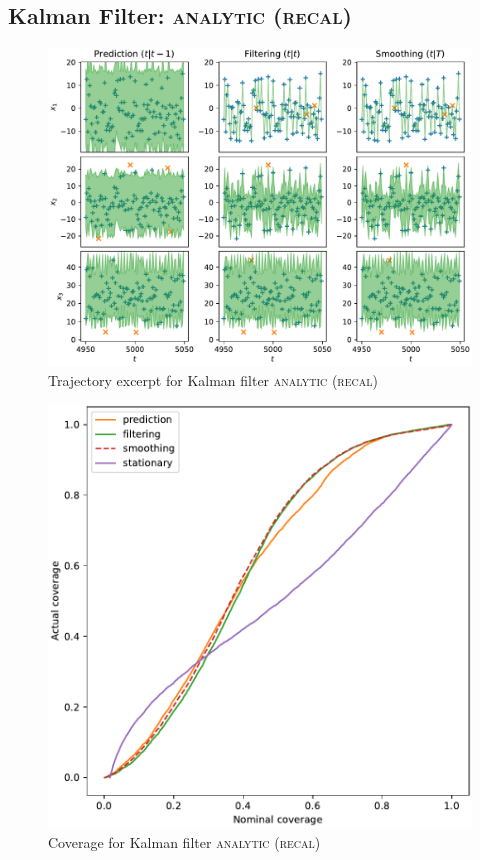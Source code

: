 \subsection{Kalman Filter: {\textsc{analytic (recal)}}}
\begin{figure}[H]
\begin{center}
\includegraphics[width=\linewidth]{generated/trajectory/Method.ANALYTIC-Recalibrate.YES.pdf}
\end{center}
\caption{Trajectory excerpt for Kalman filter \textsc{{\textsc{analytic (recal)}}}}
\end{figure}
\begin{figure}[H]
\begin{center}
\includegraphics[width=\linewidth]{generated/coverage/Method.ANALYTIC-Recalibrate.YES.pdf}
\end{center}
\caption{Coverage for Kalman filter \textsc{{\textsc{analytic (recal)}}}}
\end{figure}
